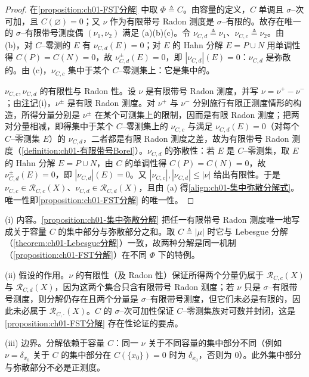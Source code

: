 \documentclass[../../main.tex]{subfiles}%
\begin{document}
\begin{proof}
在\cref{proposition:ch01-FST分解} 中取 $\Phi\triangleq C$。由容量的定义，$C$ 单调且 $\sigma$--次可加，且 $C(\varnothing)=0$；又 $\nu$ 作为有限带号 Radon 测度是 $\sigma$--有限的。故存在唯一的 $\sigma$--有限带号测度偶 $(\nu_1,\nu_2)$ 满足 (a)(b)(c)。令 $\nu_{C,d}\triangleq\nu_1$、$\nu_{C,c}\triangleq\nu_2$。由 (b)，对 $C$--零测的 $E$ 有 $\nu_{C,d}(E)=0$；对 $E$ 的 Hahn 分解 $E=P\cup N$ 用单调性得 $C(P)=C(N)=0$，故 $\nu_{C,d}^\pm(E)=0$，即 $|\nu_{C,d}|(E)=0$：$\nu_{C,d}$ 是弥散的。由 (c)，$\nu_{C,c}$ 集中于某个 $C$--零测集上：它是集中的。

$\nu_{C,c},\nu_{C,d}$ 的有限性与 Radon 性。设 $\nu$ 是有限带号 Radon 测度，并写 $\nu=\nu^+-\nu^-$；由\hyperref[remark:ch01-有限带号正则]{注记}(i)，$\nu^\pm$ 是有限 Radon 测度。对 $\nu^+$ 与 $\nu^-$ 分别施行有限正测度情形的构造，所得分量分别是 $\nu^\pm$ 在某个可测集上的限制，因而是有限 Radon 测度；把两对分量相减，即得集中于某个 $C$--零测集上的 $\nu_{C,c}$ 与满足 $\nu_{C,d}(E)=0$（对每个 $C$--零测集 $E$）的 $\nu_{C,d}$，二者都是有限 Radon 测度之差，故为有限带号 Radon 测度（\cref{definition:ch01-有限带号Borel}）。$\nu_{C,d}$ 的弥散性：若 $E$ 是 $C$--零测集，取 $E$ 的 Hahn 分解 $E=P\cup N$，由 $C$ 的单调性得 $C(P)=C(N)=0$，故 $\nu_{C,d}^\pm(E)=0$，即 $|\nu_{C,d}|(E)=0$。又 $|\nu_{C,c}|,|\nu_{C,d}|\leqslant|\nu|$ 给出有限性。于是 $\nu_{C,c}\in\mathscr{R}_{C,c}(X)$、$\nu_{C,d}\in\mathscr{R}_{C,d}(X)$，且由 (a) 得\eqref{align:ch01-集中弥散分解式}。唯一性即\cref{proposition:ch01-FST分解} 的唯一性。
\end{proof}

\begin{remark}\label{remark:ch01-集中弥散分解动机}
(i) 内容。\cref{proposition:ch01-集中弥散分解} 把任一有限带号 Radon 测度唯一地写成关于容量 $C$ 的集中部分与弥散部分之和。取 $C\triangleq|\mu|$ 时它与 Lebesgue 分解（\cref{theorem:ch01-Lebesgue分解}）一致，故两种分解是同一机制（\cref{proposition:ch01-FST分解}）在不同 $\Phi$ 下的特例。

(ii) 假设的作用。$\nu$ 的有限性（及 Radon 性）保证所得两个分量仍属于 $\mathscr{R}_{C,c}(X)$ 与 $\mathscr{R}_{C,d}(X)$，因为这两个集合只含有限带号 Radon 测度；若 $\nu$ 只是 $\sigma$--有限带号测度，则分解仍存在且两个分量是 $\sigma$--有限带号测度，但它们未必是有限的，因此未必属于 $\mathscr{R}_{C,\cdot}(X)$。$C$ 的 $\sigma$--次可加性保证 $C$--零测集族对可数并封闭，这是\cref{proposition:ch01-FST分解} 存在性论证的要点。

(iii) 边界。分解依赖于容量 $C$：同一 $\nu$ 关于不同容量的集中部分不同（例如 $\nu=\delta_{x_0}$ 关于 $C$ 的集中部分在 $C(\{x_0\})=0$ 时为 $\delta_{x_0}$，否则为 $0$）。此外集中部分与弥散部分不必是正测度。
\end{remark}
\end{document}
